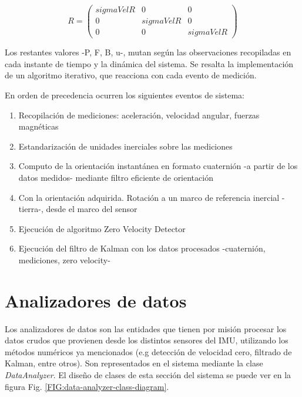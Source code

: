 \begin{equation*}
R  = \begin{pmatrix}
sigmaVelR&0&0\\
0&sigmaVelR&0\\
0&0&sigmaVelR
\end{pmatrix}
\end{equation*}

Los restantes valores -P, F, B, u-, mutan según las observaciones recopiladas en cada instante de tiempo y la dinámica del sistema. Se resalta la implementación de un algoritmo iterativo, que reacciona con cada evento de medición.

En orden de precedencia ocurren los siguientes eventos de sistema:
\begin{enumerate}
    \item Recopilación de mediciones: aceleración, velocidad angular, fuerzas magnéticas
    \item Estandarización de unidades inerciales sobre las mediciones
    \item Computo de la orientación instantánea en formato cuaternión -a partir de los datos medidos- mediante filtro eficiente de orientación
    \item Con la orientación adquirida. Rotación a un marco de referencia inercial -tierra-, desde el marco del sensor
    \item Ejecución de algoritmo Zero Velocity Detector
    \item Ejecución del filtro de Kalman con los datos procesados -cuaternión, mediciones, zero velocity-
\end{enumerate}

\newpage

\section{Analizadores de datos} 

Los analizadores de datos son las entidades que tienen por misión procesar los datos crudos que provienen desde los distintos sensores del IMU, utilizando los métodos numéricos ya mencionados (e.g detección de velocidad cero, filtrado de Kalman, entre otros). Son representados en el sistema mediante la clase \textit{DataAnalyzer}. El diseño de clases de esta sección del sistema se puede ver en la figura Fig. \ref{FIG:data-analyzer-class-diagram}. 


